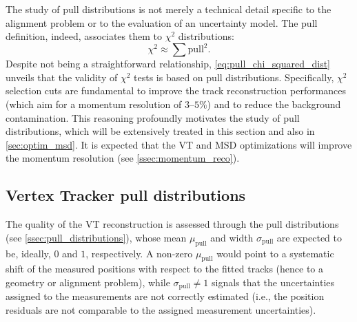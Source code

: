 The study of pull distributions is not merely a technical detail specific to the alignment problem or to the evaluation of an uncertainty model. The pull definition, indeed, associates them to $\chi^2$ distributions:
\begin{equation}
	\chi^2\approx\sum\text{pull}^2.
	\label{eq:pull_chi_squared_dist}
\end{equation}
Despite not being a straightforward relationship, \autoref{eq:pull_chi_squared_dist} unveils that the validity of $\chi^2$ tests is based on pull distributions. Specifically, $\chi^2$ selection cuts are fundamental to improve the track reconstruction performances (which aim for a momentum resolution of $3$--$5\%$) and to reduce the background contamination. This reasoning profoundly motivates the study of pull distributions, which will be extensively treated in this section and also in \autoref{sec:optim_msd}. It is expected that the VT and MSD optimizations will improve the momentum resolution (see \autoref{ssec:momentum_reco}).
\subsection{Vertex Tracker pull distributions}\label{ssec:vt_pull_overview}
The quality of the VT reconstruction is assessed through the pull distributions (see \autoref{ssec:pull_distributions}), whose mean $\mu_\text{pull}$ and width $\sigma_\text{pull}$ are expected to be, ideally, $0$ and $1$, respectively. A non-zero $\mu_\text{pull}$ would point to a systematic shift of the measured positions with respect to the fitted tracks (hence to a geometry or alignment problem), while $\sigma_\text{pull}\neq1$ signals that the uncertainties assigned to the measurements are not correctly estimated (i.e., the position residuals are not comparable to the assigned measurement uncertainties).


